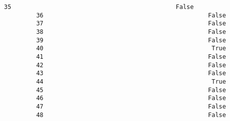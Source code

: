 \documentclass[11pt]{article}
\begin{document}
\begin{Verbatim}[commandchars=\\\{\}]
         35                                              False                                                                                      
         36                                              False                                                                                      
         37                                              False                                                                                      
         38                                              False                                                                                      
         39                                              False                                                                                      
         40                                               True                                                                                      
         41                                              False                                                                                      
         42                                              False                                                                                      
         43                                              False                                                                                      
         44                                               True                                                                                      
         45                                              False                                                                                      
         46                                              False                                                                                      
         47                                              False                                                                                      
         48                                              False                                                                                      
         

\end{Verbatim}
\end{document}

